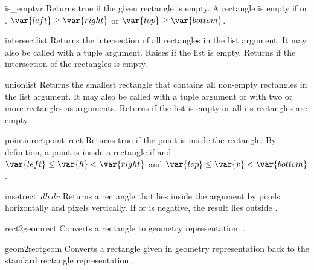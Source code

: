 \begin{funcdesc}{is_empty}{r}
Returns true if the given rectangle is empty.
A rectangle
is empty if
\iftexi
{} or .
\else
$\var{left} \geq \var{right}$ or $\var{top} \geq \var{bottom}$.
\fi
\end{funcdesc}

\begin{funcdesc}{intersect}{list}
Returns the intersection of all rectangles in the list argument.
It may also be called with a tuple argument.
Raises
if the list is empty.
Returns
if the intersection of the rectangles is empty.
\end{funcdesc}

\begin{funcdesc}{union}{list}
Returns the smallest rectangle that contains all non-empty rectangles in
the list argument.
It may also be called with a tuple argument or with two or more
rectangles as arguments.
Returns
if the list is empty or all its rectangles are empty.
\end{funcdesc}

\begin{funcdesc}{pointinrect}{point\, rect}
Returns true if the point is inside the rectangle.
By definition, a point
is inside a rectangle
 if
\iftexi
{} and
.
\else
$\var{left} \leq \var{h} < \var{right}$ and
$\var{top} \leq \var{v} < \var{bottom}$.
\fi
\end{funcdesc}

\begin{funcdesc}{inset}{rect\, \(dh\, dv\)}
Returns a rectangle that lies inside the
argument by
pixels horizontally
and
pixels
vertically.
If
or
is negative, the result lies outside
.
\end{funcdesc}

\begin{funcdesc}{rect2geom}{rect}
Converts a rectangle to geometry representation:
.
\end{funcdesc}

\begin{funcdesc}{geom2rect}{geom}
Converts a rectangle given in geometry representation back to the
standard rectangle representation
.
\end{funcdesc}
